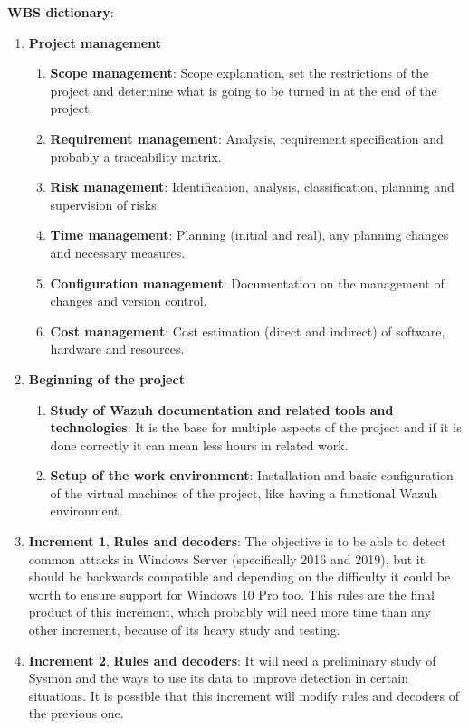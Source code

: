 \linej
\large\textbf{WBS dictionary}:\normalsize
\begin{enumerate}
	\item \textbf{Project management}
	\begin{enumerate}[label=\alph*]
		\item \textbf{Scope management}: Scope explanation, set the restrictions of the project and determine what is going to be turned in at the end of the project.
		\item \textbf{Requirement management}: Analysis, requirement specification and probably a traceability matrix.
		\item \textbf{Risk management}: Identification, analysis, classification, planning and supervision of risks.
		\item \textbf{Time management}: Planning (initial and real), any planning changes and necessary measures.
		\item \textbf{Configuration management}: Documentation on the management of changes and version control.
		\item \textbf{Cost management}: Cost estimation (direct and indirect) of software, hardware and resources.
	\end{enumerate}

	\item \textbf{Beginning of the project}
	\begin{enumerate}[label=\alph*]
		\item \textbf{Study of Wazuh documentation and related tools and technologies}: It is the base for multiple aspects of the project and if it is done correctly it can mean less hours in related work.
		\item \textbf{Setup of the work environment}: Installation and basic configuration of the virtual machines of the project, like having a functional Wazuh environment.
	\end{enumerate}

	\item \textbf{Increment 1}, \textbf{Rules and decoders}: The objective is to be able to detect common attacks in Windows Server (specifically 2016 and 2019), but it should be backwards compatible and depending on the difficulty it could be worth to ensure support for Windows 10 Pro too. This rules are the final product of this increment, which probably will need more time than any other increment, because of its heavy study and testing.

	\item \textbf{Increment 2}, \textbf{Rules and decoders}: It will need a preliminary study of Sysmon and the ways to use its data to improve detection in certain situations. It is possible that this increment will modify rules and decoders of the previous one.


\end{enumerate}
